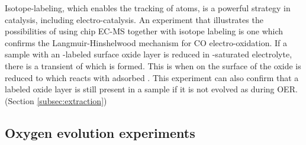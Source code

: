 
Isotope-labeling, which enables the tracking of atoms, is a powerful strategy in catalysis, including electro-catalysis. An experiment that illustrates the possibilities of using chip EC-MS together with isotope labeling is one which confirms the Langmuir-Hinshelwood mechanism for CO electro-oxidation. If a sample with an -labeled surface oxide layer is reduced in -saturated  electrolyte, there is a transient of  which is formed. This is when  on the surface of the oxide is reduced to  which reacts with adsorbed . This experiment can also confirm that a labeled oxide layer is still present in a sample if it is not evolved as  during OER.  (Section \ref{subsec:extraction})

\subsection*{Oxygen evolution experiments}

